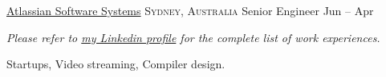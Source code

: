 \documentclass[10pt,a4paper]{article}
\begin{document}
\headedsection
  {\href{https://www.atlassian.com}{Atlassian Software Systems}}
  {\textsc{Sydney, Australia}} {%
  \headedsubsection
  {Senior Engineer}
    {Jun  -- Apr }
    {}
}

\begin{center}
  \emph{Please refer to \href{http://www.linkedin.com/in/mkramb}{my Linkedin profile} for the complete list of work experiences.}
\end{center}

\spacedhrule{0em}{-0.4em}



\inlineheadsection
  {}
  {Startups, Video streaming, Compiler design.}
\end{document}
